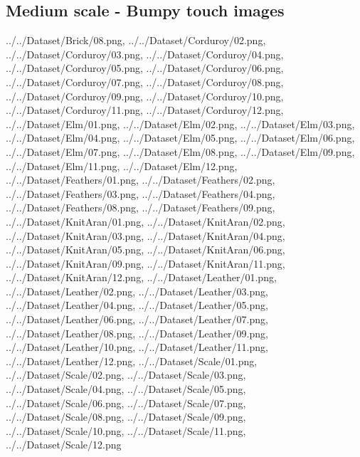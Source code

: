 \newpage
\subsection{Medium scale - Bumpy touch images}
{../../Dataset/Brick/08.png,
../../Dataset/Corduroy/02.png,
../../Dataset/Corduroy/03.png,
../../Dataset/Corduroy/04.png,
../../Dataset/Corduroy/05.png,
../../Dataset/Corduroy/06.png,
../../Dataset/Corduroy/07.png,
../../Dataset/Corduroy/08.png,
../../Dataset/Corduroy/09.png,
../../Dataset/Corduroy/10.png,
../../Dataset/Corduroy/11.png,
../../Dataset/Corduroy/12.png,
../../Dataset/Elm/01.png,
../../Dataset/Elm/02.png,
../../Dataset/Elm/03.png,
../../Dataset/Elm/04.png,
../../Dataset/Elm/05.png,
../../Dataset/Elm/06.png,
../../Dataset/Elm/07.png,
../../Dataset/Elm/08.png,
../../Dataset/Elm/09.png,
../../Dataset/Elm/11.png,
../../Dataset/Elm/12.png,
../../Dataset/Feathers/01.png,
../../Dataset/Feathers/02.png,
../../Dataset/Feathers/03.png,
../../Dataset/Feathers/04.png,
../../Dataset/Feathers/08.png,
../../Dataset/Feathers/09.png,
../../Dataset/KnitAran/01.png,
../../Dataset/KnitAran/02.png,
../../Dataset/KnitAran/03.png,
../../Dataset/KnitAran/04.png,
../../Dataset/KnitAran/05.png,
../../Dataset/KnitAran/06.png,
../../Dataset/KnitAran/09.png,
../../Dataset/KnitAran/11.png,
../../Dataset/KnitAran/12.png,
../../Dataset/Leather/01.png,
../../Dataset/Leather/02.png,
../../Dataset/Leather/03.png,
../../Dataset/Leather/04.png,
../../Dataset/Leather/05.png,
../../Dataset/Leather/06.png,
../../Dataset/Leather/07.png,
../../Dataset/Leather/08.png,
../../Dataset/Leather/09.png,
../../Dataset/Leather/10.png,
../../Dataset/Leather/11.png,
../../Dataset/Leather/12.png,
../../Dataset/Scale/01.png,
../../Dataset/Scale/02.png,
../../Dataset/Scale/03.png,
../../Dataset/Scale/04.png,
../../Dataset/Scale/05.png,
../../Dataset/Scale/06.png,
../../Dataset/Scale/07.png,
../../Dataset/Scale/08.png,
../../Dataset/Scale/09.png,
../../Dataset/Scale/10.png,
../../Dataset/Scale/11.png,
../../Dataset/Scale/12.png}

\newpage
